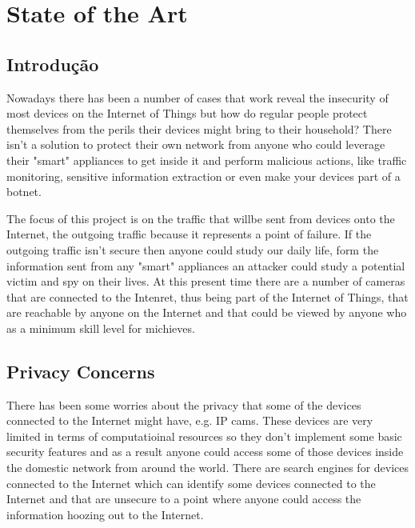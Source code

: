 \chapter{State of the Art}
\label{chap:state-of-art}

\section{Introdução}
\label{chap2:sec:intro}
Nowadays there has been a number of cases that work reveal the insecurity of
most devices on the Internet of Things
but how do regular people protect themselves from the perils their devices
might bring to their household? There isn't a solution to protect their own
network from anyone who could leverage their "smart" appliances to get inside
it and perform malicious actions, like traffic monitoring, sensitive
information extraction or even make your devices part of a botnet.

The focus of this project is on the traffic that willbe sent from devices onto
the Internet, the outgoing traffic because it represents a point of failure.
If the outgoing traffic isn't secure then anyone could study our daily life,
form the information sent from any "smart" appliances an attacker could study
a potential victim and spy on their lives. At this present time there are a
number of cameras that are connected to the Intenret, thus being part of the
Internet of Things, that are reachable by anyone on the Internet and that
could be viewed by anyone who as a minimum skill level for michieves.

\section{Privacy Concerns}
\label{chap2:sec:priv}
There has been some worries about the privacy that some of the devices
connected to the Internet might have, e.g. IP cams. These devices are very
limited in terms of computatioinal resources so they don't implement some basic
security features and as a result anyone could access some of those devices
inside the domestic network from around the world.
There are search engines for devices connected to the Internet which can
identify some devices connected to the Internet and that are unsecure to a
point where anyone could access the information hoozing out to the Internet.

